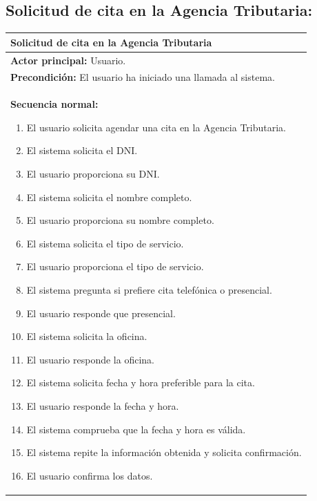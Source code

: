 \documentclass[12pt, a4paper, twoside]{report}
\begin{document}
        \subsection{Solicitud de cita en la Agencia Tributaria:}
            \begin{table}[H]
            \centering
            \begin{tabular}{|p{16cm}|} 
            \hline
            \textbf{Solicitud de cita en la Agencia Tributaria} \\ \hline
            \textbf{Actor principal:} Usuario. \\ \hline
            \textbf{Precondición:} El usuario ha iniciado una llamada al sistema. \\ \hline
            \textbf{Secuencia normal:}
                \begin{enumerate}
                    \item El usuario solicita agendar una cita en la Agencia Tributaria.
                    \item El sistema solicita el DNI.
                    \item El usuario proporciona su DNI.
                    \item El sistema solicita el nombre completo.
                    \item El usuario proporciona su nombre completo.
                    \item El sistema solicita el tipo de servicio.
                    \item El usuario proporciona el tipo de servicio.
                    \item El sistema pregunta si prefiere cita telefónica o presencial.
                    \item El usuario responde que presencial.
                    \item El sistema solicita la oficina.
                    \item El usuario responde la oficina.
                    \item El sistema solicita fecha y hora preferible para la cita.
                    \item El usuario responde la fecha y hora.
                    \item El sistema comprueba que la fecha y hora es válida.
                    \item El sistema repite la información obtenida y solicita confirmación. 
                    \item El usuario confirma los datos.

\end{enumerate}
\end{tabular}
\end{table}
\end{document}
